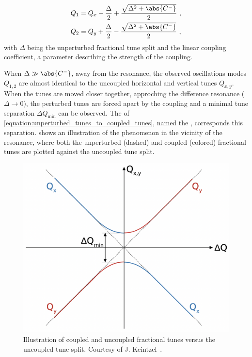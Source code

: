 \begin{equation}
    \begin{aligned}
        Q_1 &= Q_x- \frac{\Delta}{2} + \frac{\sqrt{\Delta^2 + \abs{C^{-}}}}{2} \text{ ,} \\
        Q_2 &= Q_y+ \frac{\Delta}{2} - \frac{\sqrt{\Delta^2 + \abs{C^{-}}}}{2} \text{ ,}
    \end{aligned}
    \label{equation:unperturbed_tunes_to_coupled_tunes}
\end{equation}
with \(\Delta\) being the unperturbed fractional tune split and \AbsCminus the linear coupling coefficient, a parameter describing the strength of the coupling.

When \(\Delta \gg \abs{C^{-}}\), away from the resonance, the observed oscillations modes \(Q_{1,2}\) are almost identical to the uncoupled horizontal and vertical tunes \(Q_{x,y}\).
When the tunes are moved closer together, approching the difference resonance (\(\Delta \rightarrow 0\)), the perturbed tunes are forced apart by the coupling and a minimal tune separation \(\Delta Q_{\mathrm{min}}\) can be observed.
The \AbsCminus of \cref{equation:unperturbed_tunes_to_coupled_tunes}, named the , corresponds this separation.
 shows an illustration of the phenomenon in the vicinity of the resonance, where both the unperturbed (dashed) and coupled (colored) fractional tunes are plotted against the uncoupled tune split.
\begin{figure}[!htb]
    \centering
    \includegraphics[width = 0.9\linewidth]{Figures/Beam_Dynamics_Theory/closest_tune_approach_schematic.png}
    \caption{Illustration of coupled and uncoupled fractional tunes versus the uncoupled tune split. Courtesy of J. Keintzel~\cite{PHD:Keintzel}.}
    \label{figure:closest_tune_approach}
\end{figure}


